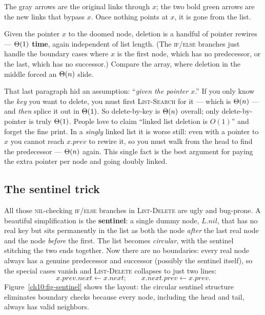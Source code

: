 The gray arrows are the original links through $x$; the two bold green arrows are the new links that bypass $x$. Once nothing points at $x$, it is gone from the list.

\begin{algorithm}[H]
\caption{\textsc{List-Delete}$(L, x)$ --- remove node $x$ from a doubly linked list}
\DontPrintSemicolon
{}
\end{algorithm}

Given the pointer $x$ to the doomed node, deletion is a handful of pointer rewires --- \textbf{$\Theta(1)$ time}, again independent of list length. (The \textsc{if}/\textsc{else} branches just handle the boundary cases where $x$ is the first node, which has no predecessor, or the last, which has no successor.) Compare the array, where deletion in the middle forced an $\Theta(n)$ slide.

\begin{trapbox}
That last paragraph hid an assumption: ``\emph{given the pointer $x$}.'' If you only know the \emph{key} you want to delete, you must first \textsc{List-Search} for it --- which is $\Theta(n)$ --- and \emph{then} splice it out in $\Theta(1)$. So delete-by-key is $\Theta(n)$ overall; only delete-by-pointer is truly $\Theta(1)$. People love to claim ``linked list deletion is $O(1)$'' and forget the fine print. In a \emph{singly} linked list it is worse still: even with a pointer to $x$ you cannot reach $x.prev$ to rewire it, so you must walk from the head to find the predecessor --- $\Theta(n)$ again. This single fact is the best argument for paying the extra pointer per node and going doubly linked.
\end{trapbox}

\subsection{The sentinel trick}

All those \textsc{nil}-checking \textsc{if}/\textsc{else} branches in \textsc{List-Delete} are ugly and bug-prone. A beautiful simplification is the \textbf{sentinel}: a single dummy node, $L.\mathit{nil}$, that has no real key but sits permanently in the list as both the node \emph{after} the last real node and the node \emph{before} the first. The list becomes \emph{circular}, with the sentinel stitching the two ends together. Now there are no boundaries: every real node always has a genuine predecessor and successor (possibly the sentinel itself), so the special cases vanish and \textsc{List-Delete} collapses to just two lines:
\[
  x.\mathit{prev}.\mathit{next} \gets x.\mathit{next}; \qquad x.\mathit{next}.\mathit{prev} \gets x.\mathit{prev}.
\]
Figure~\ref{ch10:fig-sentinel} shows the layout: the circular sentinel structure eliminates boundary checks because every node, including the head and tail, always has valid neighbors.

